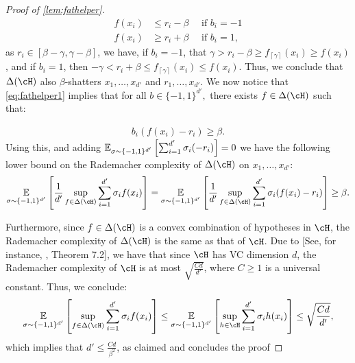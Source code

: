 \begin{proof}[Proof of \cref{lem:fathelper}]
    \begin{align}\label{eq:fathelper1}
        f(x_i)&\leq r_{i} -\beta \quad \text{ if  } b_{i}=-1
        \\
        f(x_i)&\geq r_{i}+\beta  \quad \text{ if  } b_{i}=1,\nonumber
      \end{align}
      as $ r_{i}\in \left[\beta-\gamma,\gamma  -\beta\right] $, we have, if $ b_{i}=-1 $, that  $  \gamma > r_{i}-\beta \geq f_{\left\lceil\gamma\right\rceil}(x_{i}) \geq f(x_{i}) $, and if $ b_{i}=1 $, then $-\gamma< r_{i}+\beta \leq f_{\left\lceil\gamma\right\rceil}(x_{i})\leq f(x_{i}).$ Thus, we conclude that $ \dlh $ also $ \beta$-shatters  $ x_{1},\ldots,x_{d'} $ and $ r_{1},\ldots,x_{d'} $. We now notice that \cref{eq:fathelper1} implies that for all $ b\in \{  -1,1\}^{d'}  ,$ there exists $ f\in \dlh $ such that:

      \begin{align*}
        b_{i}(f(x_{i})-r_{i})\geq \beta.
      \end{align*}
      Using this, and adding $\operatorname*{\mathbb{E}}_{\sigma\sim \{-1,1  \}^{d'}}\left[ \sum_{i=1}^{d'}  \sigma_{i}(-r_{i})\right]  =0 $ we have the following lower bound on the Rademacher complexity of $ \dlh $ on $ x_{1},\ldots,x_{d'} $:
      \begin{align*}
       \e_{\sigma\sim \{  -1,1\}^{d'} }\left[\frac{1}{d'}\sup_{f\in \dlh} \sum_{i=1}^{d'}  \sigma_{i}f(x_{i})\right]
       =\e_{\sigma\sim \{  -1,1\}^{d'} }\left[\frac{1}{d'}\sup_{f\in \dlh} \sum_{i=1}^{d'}  \sigma_{i} (f(x_{i})-r_{i}) \right]
       \geq \beta.
      \end{align*}

      Furthermore, since $ f\in \dlh $ is a convex combination of hypotheses in $ \cH $, the Rademacher complexity of $ \dlh $ is the same as that of $ \cH $. Due to \cite{dudley} [See, for instance, \cite{rademacherboundlecturenotes}, Theorem 7.2], we have that since $ \cH $ has VC dimension $ d $, the   Rademacher complexity of $ \cH $  is at most $ \sqrt{\frac{Cd}{d'}} $, where $ C\geq 1 $ is a universal constant. Thus, we conclude:
            \begin{align*}
        \e_{\sigma\sim \{  -1,1\}^{d'} }\left[\sup_{f\in \dlh} \sum_{i=1}^{d'}  \sigma_{i}f(x_{i})\right]
        \leq
        \e_{\sigma\sim \{  -1,1\}^{d'} }\left[\sup_{h\in \cH} \sum_{i=1}^{d'}  \sigma_{i}h(x_{i})\right]
        \leq \sqrt{\frac{Cd}{d'}},
      \end{align*}
      which implies that $ d'\leq \frac{Cd}{\beta^{2}} $, as claimed and concludes the proof          
\end{proof}




